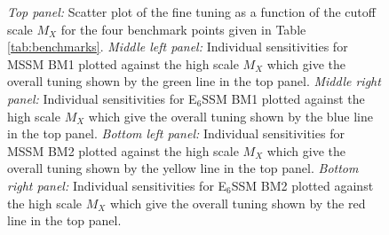 \documentclass[preprint,amsmath,amssymb,aps,superscriptaddress,prd,showpacs,floatfix,nofootinbib]{revtex4-1}
\begin{document}
\begin{figure}
\begin{center}
\caption{\textit{Top panel:} Scatter plot of the fine tuning as a function of the cutoff scale $M_X$ for the four benchmark points given in Table \ref{tab:benchmarks}. \textit{Middle left panel:}  Individual sensitivities for MSSM BM1 plotted against the high scale $M_X$ which give the overall tuning shown by the green line in the top panel. \textit{Middle right panel:} Individual sensitivities for E$_6$SSM BM1 plotted against the high scale $M_X$ which give the overall tuning shown by the blue line in the top panel. \textit{Bottom left panel:} Individual sensitivities for MSSM BM2 plotted against the high scale $M_X$ which give the overall tuning shown by the yellow line in the top panel. \textit{Bottom right panel:} Individual sensitivities for E$_6$SSM BM2 plotted against the high scale $M_X$ which give the overall tuning shown by the red line in the top panel.    }
\label{Fig:BMs-varyMX}
\end{center}
\end{figure}
\end{document}
